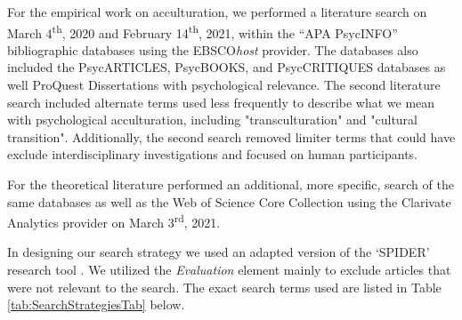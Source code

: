 \documentclass[man, 12pt, a4paper, mask]{apa7}
\begin{document}
For the empirical work on acculturation, we performed a literature search on March 4\textsuperscript{th}, 2020 and February 14\textsuperscript{th}, 2021, within the ``APA PsycINFO'' bibliographic databases using the EBSCO\textit{host} provider. The databases also included the PsycARTICLES, PsycBOOKS, and PsycCRITIQUES databases as well ProQuest Dissertations with psychological relevance. The second literature search included alternate terms used less frequently to describe what we mean with psychological acculturation, including "transculturation" and "cultural transition". Additionally, the second search removed limiter terms that could have exclude interdisciplinary investigations and focused on human participants.

For the theoretical literature performed an additional, more specific, search of the same databases as well as the Web of Science Core Collection using the Clarivate Analytics provider on March 3\textsuperscript{rd}, 2021.

In designing our search strategy we used an adapted version of the `SPIDER' research tool \citep[e.g.,][]{Cooke2012}. We utilized the \textit{Evaluation} element mainly to exclude articles that were not relevant to the search. The exact search terms used are listed in Table \ref{tab:SearchStrategiesTab} below.


\end{document}
